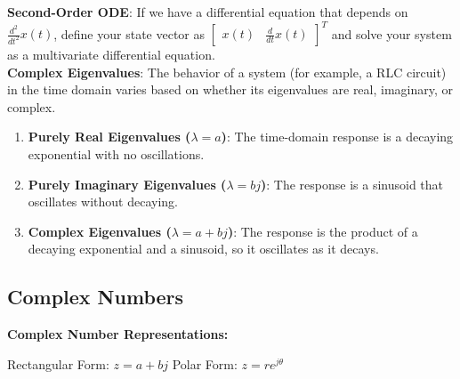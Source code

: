 \textbf{Second-Order ODE}: If we have a differential equation that depends on $\frac{d^2}{dt^2} x(t)$, define your state vector as $\begin{bmatrix} x(t) & \frac{d}{dt} x(t) \end{bmatrix}^T$ and solve your system as a multivariate differential equation.
\\

\textbf{Complex Eigenvalues}: The behavior of a system (for example, a RLC circuit) in the time domain varies based on whether its eigenvalues are real, imaginary, or complex.
\begin{enumerate}
    \item \textbf{Purely Real Eigenvalues ($\lambda = a$)}: The time-domain response is a decaying exponential with no oscillations.
    \item \textbf{Purely Imaginary Eigenvalues ($\lambda = bj$)}: The response is a sinusoid that oscillates without decaying.
    \item \textbf{Complex Eigenvalues ($\lambda = a + bj$)}: The response is the product of a decaying exponential and a sinusoid, so it oscillates as it decays.
\end{enumerate}

\subsection*{Complex Numbers}
\textbf{Complex Number Representations:} 

\hspace{2 em} Rectangular Form: $z = a + bj$ \hspace{14em} Polar Form: $z = re^{j\theta}$

